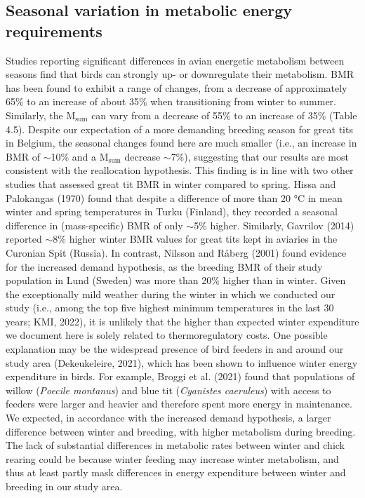 \documentclass[10pt, twoside]{book} %
\begin{document}
\subsection{Seasonal variation in metabolic energy requirements}
Studies reporting significant differences in avian energetic metabolism between seasons find that birds can strongly up- or downregulate their metabolism. BMR has been found to exhibit a range of changes, from a decrease of approximately 65\% to an increase of about 35\% when transitioning from winter to summer. Similarly, the M$_{\text{sum}}$ can vary from a decrease of 55\% to an increase of 35\% (Table 4.5). Despite our expectation of a more demanding breeding season for great tits in Belgium, the seasonal changes found here are much smaller (i.e., an increase in BMR of $\sim$10\% and a M$_{\text{sum}}$ decrease $\sim$7\%), suggesting that our results are most consistent with the reallocation hypothesis. This finding is in line with two other studies that assessed great tit BMR in winter compared to spring. Hissa and Palokangas (1970) found that despite a difference of more than 20 °C in mean winter and spring temperatures in Turku (Finland), they recorded a seasonal difference in (mass-specific) BMR of only $\sim$5\% higher. Similarly, Gavrilov (2014) reported $\sim$8\% higher winter BMR values for great tits kept in aviaries in the Curonian Spit (Russia). In contrast, Nilsson and Råberg (2001) found evidence for the increased demand hypothesis, as the breeding BMR of their study population in Lund (Sweden) was more than 20\% higher than in winter. Given the exceptionally mild weather during the winter in which we conducted our study (i.e., among the top five highest minimum temperatures in the last 30 years; KMI, 2022), it is unlikely that the higher than expected winter expenditure we document here is solely related to thermoregulatory costs. One possible explanation may be the widespread presence of bird feeders in and around our study area (Dekeukeleire, 2021), which has been shown to influence winter energy expenditure in birds. For example, Broggi et al. (2021) found that populations of willow (\textit{Poecile montanus}) and blue tit (\textit{Cyanistes caeruleus}) with access to feeders were larger and heavier and therefore spent more energy in maintenance. We expected, in accordance with the increased demand hypothesis, a larger difference between winter and breeding, with higher metabolism during breeding. The lack of substantial differences in metabolic rates between winter and chick rearing could be because winter feeding may increase winter metabolism, and thus at least partly mask differences in energy expenditure between winter and breeding in our study area.\\
\end{document}
